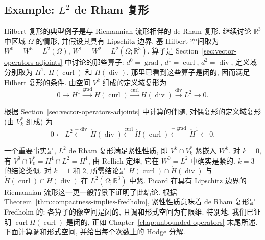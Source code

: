 \subsection{{Example: $L^2$ de Rham 复形}}\label{sec:l2-de-rham-complex}

{Hilbert 复形的典型例子是与 Riemannian 流形相伴的 de Rham 复形. 继续讨论 $\mathbb R^3$ 中区域 $\Omega$ 的情形, 并假设其具有 Lipschitz 边界. 基 Hilbert 空间取为 $W^0=W^3=L^2(\Omega)$, $W^1=W^2=L^2(\Omega;\mathbb R^3)$. 算子是 Section~\ref{sec:vector-operators-adjoints} 中讨论的那些算子: $d^0=\operatorname{grad}$, $d^1=\operatorname{curl}$, $d^2=\operatorname{div}$, 定义域分别取为 $H^1$, $H(\operatorname{curl})$ 和 $H(\operatorname{div})$. 那里已看到这些算子是闭的, 因而满足 Hilbert 复形的条件. 由空间 $V^k$ 组成的定义域复形为}
\begin{equation}\label{eq:l2-de-rham-domain-complex}
0\to H^1\xrightarrow{\operatorname{grad}}H(\operatorname{curl})\xrightarrow{\operatorname{curl}}H(\operatorname{div})\xrightarrow{\operatorname{div}}L^2\to0.
\end{equation}

{根据 Section~\ref{sec:vector-operators-adjoints} 中计算的伴随, 对偶复形的定义域复形 (由 $V_k^*$ 组成) 为}
\begin{equation}\label{eq:l2-dual-domain-complex}
0\leftarrow L^2\xleftarrow{-\operatorname{div}}\mathring H(\operatorname{div})\xleftarrow{\operatorname{curl}}\mathring H(\operatorname{curl})\xleftarrow{-\operatorname{grad}}\mathring H^1\leftarrow0.
\end{equation}

{一个重要事实是, $L^2$ de Rham 复形满足紧性性质, 即 $V^k\cap V_k^*$ 紧嵌入 $W^k$. 对 $k=0$, 有 $V^0\cap V_0^*=H^1\cap L^2=H^1$, 由 Rellich 定理, 它在 $W^0=L^2$ 中确实是紧的. $k=3$ 的结论类似. 对 $k=1$ 和 $2$, 所需结论是 $H(\operatorname{curl})\cap\mathring H(\operatorname{div})$ 与 $\mathring H(\operatorname{curl})\cap H(\operatorname{div})$ 在 $L^2(\Omega;\mathbb R^3)$ 中紧. Picard  在具有 Lipschitz 边界的 Riemannian 流形这一更一般背景下证明了此结论. 根据 Theorem~\ref{thm:compactness-implies-fredholm}, 紧性性质意味着 de Rham 复形是 Fredholm 的: 各算子的像空间是闭的, 且调和形式空间为有限维. 特别地, 我们已证明 $\operatorname{curl}H(\operatorname{curl})$ 是闭的, 正如 Chapter~\ref{chap:unbounded-operators} 末尾所述. 下面计算调和形式空间, 并给出每个次数上的 Hodge 分解.}

